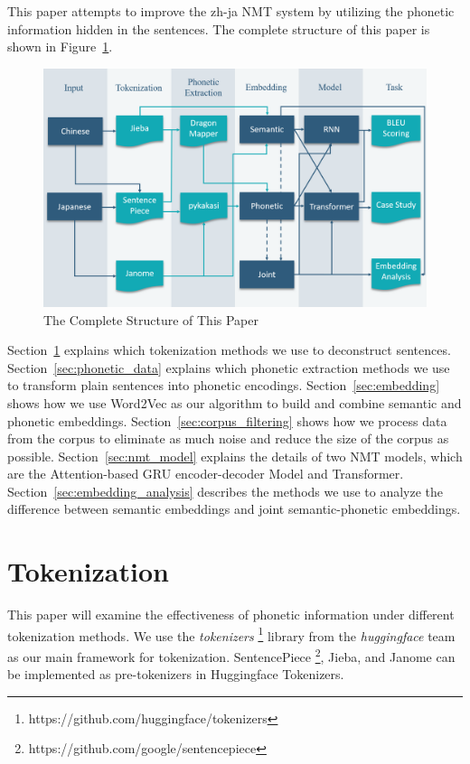 \hspace{24pt}

This paper attempts to improve the zh-ja NMT system by utilizing the phonetic information hidden in the sentences. The complete structure of this paper is shown in Figure~\ref{fig:structure}.

\begin{figure}[h]
	\centering
	\includegraphics[scale=0.6]{../images/structure.png}
    \caption{The Complete Structure of This Paper}
	\label{fig:structure}
\end{figure}

Section~\ref{sec:tokenization} explains which tokenization methods we use to deconstruct sentences. Section~\ref{sec:phonetic_data} explains which phonetic extraction methods we use to transform plain sentences into phonetic encodings. Section~\ref{sec:embedding} shows how we use Word2Vec as our algorithm to build and combine semantic and phonetic embeddings. Section~\ref{sec:corpus_filtering} shows how we process data from the corpus to eliminate as much noise and reduce the size of the corpus as possible. Section~\ref{sec:nmt_model} explains the details of two NMT models, which are the Attention-based GRU encoder-decoder Model and Transformer. Section~\ref{sec:embedding_analysis} describes the methods we use to analyze the difference between semantic embeddings and joint semantic-phonetic embeddings.

\section{Tokenization} \label{sec:tokenization}

This paper will examine the effectiveness of phonetic information under different tokenization methods. We use the \textit{tokenizers} \footnote{https://github.com/huggingface/tokenizers} library from the \textit{huggingface} team as our main framework for tokenization. SentencePiece \footnote{https://github.com/google/sentencepiece}, Jieba, and Janome can be implemented as pre-tokenizers in Huggingface Tokenizers.

